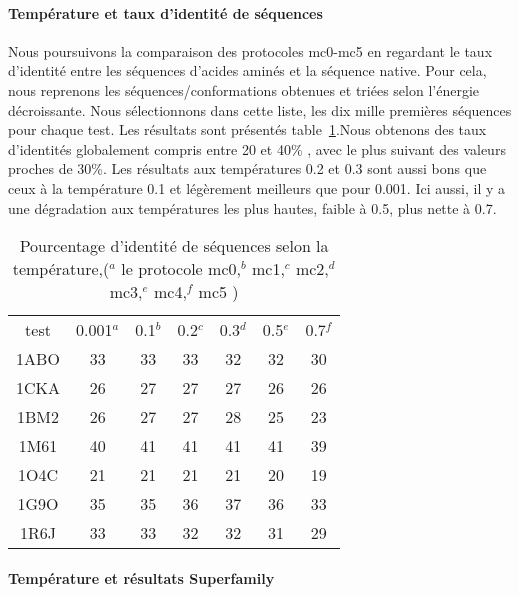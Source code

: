    \paragraph{Température et taux d'identité de séquences} 
\label{sec:T_et_I}
Nous poursuivons la comparaison des protocoles mc0-mc5 en regardant le taux d'identité entre les séquences d'acides aminés et la séquence native. Pour cela, nous reprenons les séquences/conformations obtenues et triées selon l'énergie décroissante. Nous sélectionnons dans cette liste, les dix mille premières séquences pour chaque test. Les résultats sont présentés table~\ref{tab:ident_mc}.Nous obtenons des taux d'identités globalement compris entre 20 et 40\% , avec le plus suivant des valeurs proches de 30\%. Les résultats aux températures 0.2 et 0.3 sont aussi bons que ceux à la température 0.1 et légèrement meilleurs que pour 0.001. Ici aussi, il y a une dégradation aux températures les plus hautes, faible à 0.5, plus nette à 0.7.

    \begin{table}[!htbp]
      \centering

      \begin{tabular}{ccccccc}
      
        \toprule
         test & 0.001$^a$ & 0.1$^b$ & 0.2$^c$  & 0.3$^d$ & 0.5$^e$ & 0.7$^f$  \\
        \cmidrule{1-7}
        1ABO & 33 & 33 & 33 & 32 & 32  & 30 \\      
        1CKA & 26 & 27 & 27 & 27 & 26  & 26 \\  
        1BM2 & 26 & 27 & 27 & 28 & 25  & 23 \\  
        1M61 & 40 & 41 & 41 & 41 & 41  & 39 \\  
        1O4C & 21 & 21 & 21 & 21 & 20  & 19 \\  
        1G9O & 35 & 35 & 36 & 37 & 36  & 33 \\  
        1R6J & 33 & 33 & 32 & 32 & 31  & 29 \\  
        \bottomrule
        
      \end{tabular}
      

      \caption{Pourcentage d'identité de séquences selon la température,($^a$ le protocole mc0,$^b$ mc1,$^c$  mc2,$^d$ mc3,$^e$ mc4,$^f$ mc5 )}      
      \label{tab:ident_mc}
    \end{table}



   \paragraph{Température et résultats Superfamily} 

